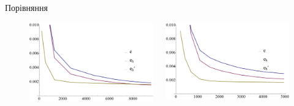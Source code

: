 \begin{frame}{Порівняння}
	\begin{figure}[H]
		\begin{columns}
		 	\begin{column}{0.5\textwidth}
		 		\includegraphics[width=\textwidth]{problem2/my/Plotnb}
		 	 \end{column}
		     \begin{column}{0.5\textwidth}
		     	\includegraphics[width=\textwidth]{problem2/ost/Plotnb}
		     \end{column}
		\end{columns}
	\end{figure}
\end{frame}

